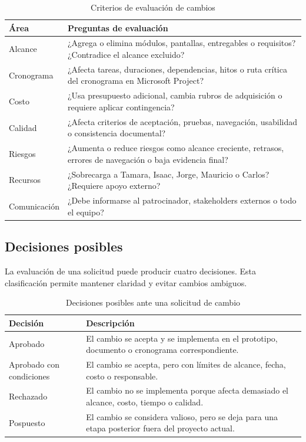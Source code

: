 \documentclass[11pt,spanish]{article}
\begin{document}
\begin{table}[H]
\centering
\caption{Criterios de evaluación de cambios}
\label{tab:criterios-evaluacion-cambios}
{\small
\begin{tabularx}{\textwidth}{p{3.5cm} Y}
\toprule
\textbf{Área} & \textbf{Preguntas de evaluación} \\
\midrule
Alcance & ¿Agrega o elimina módulos, pantallas, entregables o requisitos? ¿Contradice el alcance excluido? \\
Cronograma & ¿Afecta tareas, duraciones, dependencias, hitos o ruta crítica del cronograma en Microsoft Project? \\
Costo & ¿Usa presupuesto adicional, cambia rubros de adquisición o requiere aplicar contingencia? \\
Calidad & ¿Afecta criterios de aceptación, pruebas, navegación, usabilidad o consistencia documental? \\
Riesgos & ¿Aumenta o reduce riesgos como alcance creciente, retrasos, errores de navegación o baja evidencia final? \\
Recursos & ¿Sobrecarga a Tamara, Isaac, Jorge, Mauricio o Carlos? ¿Requiere apoyo externo? \\
Comunicación & ¿Debe informarse al patrocinador, stakeholders externos o todo el equipo? \\
\bottomrule
\end{tabularx}
}
\end{table}

\subsection{Decisiones posibles}

La evaluación de una solicitud puede producir cuatro decisiones. Esta clasificación permite mantener claridad y evitar cambios ambiguos.

\begin{table}[H]
\centering
\caption{Decisiones posibles ante una solicitud de cambio}
\label{tab:decisiones-cambios}
{\small
\begin{tabularx}{\textwidth}{p{3cm} Y}
\toprule
\textbf{Decisión} & \textbf{Descripción} \\
\midrule
Aprobado & El cambio se acepta y se implementa en el prototipo, documento o cronograma correspondiente. \\
Aprobado con condiciones & El cambio se acepta, pero con límites de alcance, fecha, costo o responsable. \\
Rechazado & El cambio no se implementa porque afecta demasiado el alcance, costo, tiempo o calidad. \\
Pospuesto & El cambio se considera valioso, pero se deja para una etapa posterior fuera del proyecto actual. \\
\bottomrule
\end{tabularx}
}
\end{table}
\end{document}
